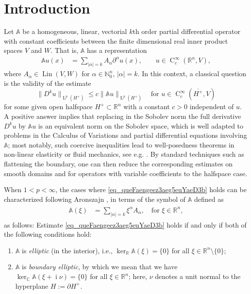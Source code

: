 \documentclass[a4paper,10pt]{amsart}
\newcommand{\R}{\mathbb R}
\newcommand{\N}{\mathbb N}
\renewcommand{\leq}{\leqslant}
\newcommand{\lebe}{\operatorname{L}}
\newcommand{\imag}{\operatorname{i}}
\newcommand{\hold}{\operatorname{C}}
\newcommand{\A}{\mathbb{A}}
\newcommand{\lin}{\operatorname{Lin}}
\numberwithin{equation}{section}
\theoremstyle{remark}
\numberwithin{equation}{section}
\begin{document}
	\section{Introduction}
	Let $\mathbb{A}$ be a homogeneous, linear, vectorial \(k\)th order partial differential operator with constant  coefficients between the finite dimensional real inner product spaces $V$ and $W$. That is, $\A$ has a  representation
	\begin{align}\label{eq:A}
		\A u(x)&=\sum_{|\alpha|=k} A_\alpha \partial^\alpha u(x),\qquad u\in\hold_{c}^{\infty}(\R^{n},V),
	\end{align}
	where $A_\alpha\in \lin(V,W)$ for $\alpha\in\N_0^n$, $|\alpha|=k$. In this context, a classical question is the validity of the estimate
	\begin{equation}
		\label{eq_queFaengeez3aeg5euYaeD3b}
		\|D^k u\|_{\lebe^p(H^{+})}\leq c\|\A u\|_{\lebe^p(H^{+})}\quad \text{for }u\in\hold_{c}^\infty(\overline{H^{+}},V)
	\end{equation}
	for some given open halfspace $H^{+}\subset\R^{n}$ with a constant $c>0$ independent of $u$. A positive answer implies that replacing in the Sobolev norm the full derivative \(D^k u\) by \(\A u\) is an equivalent norm on the Sobolev space, which is well adapted to problems in the Calculus of Variations and partial differential equations involving \(\A\); most notably, such coercive inequalities lead to well-posedness theorems in non-linear elasticity or fluid mechanics, see e.g. \cite{Friedrichs,FuchsSeregin,Korn}. By standard techniques such as flattening the boundary, one can then reduce the corresponding estimates on smooth domains and for operators with variable coefficients to the halfspace case.
	
	When \(1 < p < \infty\), the cases where \eqref{eq_queFaengeez3aeg5euYaeD3b} holds can be characterized following Aronszajn \cite[Thm.~V]{Aronszajn}, in terms of the symbol of \(\A\) defined as
	\begin{align*}
		\begin{split}
			\A(\xi)&=\sum_{|\alpha|=k} \xi^\alpha A_\alpha,\quad\text{for }\xi\in\R^n,
		\end{split}
	\end{align*}
	as follows: Estimate \eqref{eq_queFaengeez3aeg5euYaeD3b} holds if and only if both of the following conditions hold:
	\begin{enumerate}
		\item\label{itm:ell} $\A$ is \emph{elliptic} (in the interior), i.e., $\ker_\R\A(\xi)=\{0\}$ for all   $\xi\in\R^n\setminus\{0\}$;
		\item\label{itm:bell} $\A$ is \emph{boundary elliptic}, by which we mean that we have $\ker_{\mathbb{C}}\A(\xi+\imag \nu)=\{0\}$ for all $\xi\in\R^{n}$; here, $\nu$ denotes a unit normal to the hyperplane $H:=\partial H^{+}$.
	\end{enumerate}
	
\end{document}
